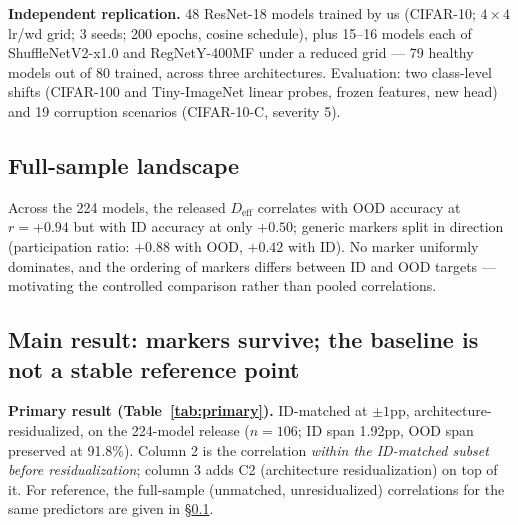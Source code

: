 \documentclass[10pt]{article} %
\newcommand{\srcref}[1]{\S\ref{#1}}
\begin{document}
\textbf{Independent replication.} 48 ResNet-18 models trained by us (CIFAR-10; $4\times4$ lr/wd grid; 3 seeds; 200 epochs, cosine schedule), plus 15--16 models each of ShuffleNetV2-x1.0 \citep{ma2018shufflenet} and RegNetY-400MF \citep{radosavovic2020designing} under a reduced grid --- 79 healthy models out of 80 trained, across three architectures. Evaluation: two class-level shifts (CIFAR-100 and Tiny-ImageNet \citep{le2015tiny} linear probes, frozen features, new head) and 19 corruption scenarios (CIFAR-10-C, severity 5).

\subsection{Full-sample landscape}
\label{sub:fullsample}

Across the 224 models, the released $D_{\mathrm{eff}}$ correlates with OOD accuracy at $r=+0.94$ but with ID accuracy at only $+0.50$; generic markers split in direction (participation ratio: $+0.88$ with OOD, $+0.42$ with ID). No marker uniformly dominates, and the ordering of markers differs between ID and OOD targets --- motivating the controlled comparison rather than pooled correlations.

\subsection{Main result: markers survive; the baseline is not a stable reference point}
\label{sub:mainresult}

\textbf{Primary result (Table~\ref{tab:primary}).} ID-matched at $\pm1$pp, architecture-residualized, on the 224-model release ($n=106$; ID span 1.92pp, OOD span preserved at 91.8\%). Column 2 is the correlation \emph{within the ID-matched subset before residualization}; column 3 adds C2 (architecture residualization) on top of it. For reference, the full-sample (unmatched, unresidualized) correlations for the same predictors are given in \srcref{sub:fullsample}.
\end{document}
